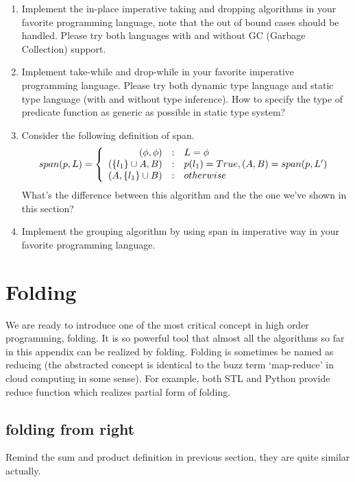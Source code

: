 \documentclass[UTF8]{article}
\begin{document}
\begin{Exercise}
\begin{enumerate}
\item Implement the in-place imperative taking and dropping algorithms in your favorite programming language, note that
the out of bound cases should be handled. Please try both languages with and without GC (Garbage Collection) support.
\item Implement take-while and drop-while in your favorite imperative programming language. Please try both dynamic
type language and static type language (with and without type inference). How to specify the type of predicate function
as generic as possible in static type system?
\item Consider the following definition of span.
\[
span(p, L) =  \left \{
  \begin{array}
  {r@{\quad:\quad}l}
  (\phi, \phi) & L = \phi \\
  (\{ l_1 \} \cup A, B) & p(l_1) = True, (A, B) = span(p, L') \\
  (A, \{l_1\} \cup B) & otherwise
  \end{array}
\right.
\]
What's the difference between this algorithm and the the one we've shown in this section?
\item Implement the grouping algorithm by using span in imperative way in your favorite programming language.
\end{enumerate}
\end{Exercise}

\section{Folding}

We are ready to introduce one of the most critical concept in high order programming, folding. It is so powerful tool
that almost all the algorithms so far in this appendix can be realized by folding. Folding is sometimes be named as
reducing (the abstracted concept is identical to the buzz term `map-reduce' in cloud computing in some sense). For example,
both STL and Python provide reduce function which realizes partial form of folding.

\subsection{folding from right}
Remind the sum and product definition in previous section, they are quite similar actually.
\end{document}
